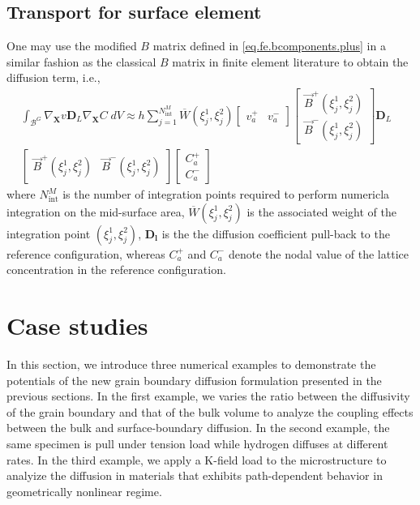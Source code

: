 \documentclass[10pt]{elsarticle}
\newcommand{\mbs}[1]{\boldsymbol{#1}}
\def\bs{{\mbs{s}}} \def\bt{{\mbs{t}}} \def\bu{{\mbs{u}}}
\def\bs{\boldsymbol}
\newcommand{\tensor}[1]{\ensuremath{\boldsymbol{#1}}}
\begin{document}
\subsection{Transport for surface element}
One may use the modified $B$ matrix defined in
\eqref{eq.fe.bcomponents.plus} in a similar fashion as the classical 
$B$ matrix in finite element literature to obtain the diffusion term, i.e., 
\begin{align}
\label{eq:DiscreteDiffusion} 
 \int_{\mathcal{B}^{G}} \nabla_{\bs{X}} v \bs{D}_{L} \nabla_{\bs{X}} C \; dV
  \approx   
h \sum_{j=1}^{N^{M}_{\text{int}}}  \overline{W}(\xi_{j}^{1}, \xi_{j}^{2})
\begin{bmatrix} v_{a}^{+} &  v_{a}^{-} \end{bmatrix} 
\begin{bmatrix} \vec{B}^{+}(\xi_{j}^{1}, \xi_{j}^{2}) \\ \vec{B}^{-}(\xi_{j}^{1}, \xi_{j}^{2}) \end{bmatrix}
\tensor{D}_{L} \nonumber \\
\begin{bmatrix} \vec{B}^{+}(\xi_{j}^{1}, \xi_{j}^{2}) & \vec{B}^{-}(\xi_{j}^{1}, \xi_{j}^{2}) \end{bmatrix} 
\begin{bmatrix} C_{a}^{+} \\ C_{a}^{-} \end{bmatrix} &
\end{align}
where $N^{M}_{\text{int}}$ is the number of integration points required to 
perform numericla integration on the mid-surface area, 
$\overline{W}(\xi^{1}_{j}, \xi_{j}^{2})$ is the associated weight
of the integration point $(\xi^{1}_{j}, \xi_{j}^{2})$, $\tensor{D_{l}}$ is the 
the diffusion coefficient pull-back to the reference configuration, whereas 
$C_{a}^{+}$ and $C_{a}^{-}$ denote the nodal value of the lattice
concentration in the reference configuration.  
 
\section{Case studies}
In this section, we introduce three numerical examples to demonstrate the potentials of the 
new grain boundary diffusion formulation presented in the previous sections.
In the first example, we varies the ratio between the diffusivity of the grain boundary 
and that of the bulk volume to analyze the coupling effects between the bulk
and surface-boundary diffusion. In the second example, the same specimen is pull 
under tension load while hydrogen diffuses at different rates. In the third example,
we apply a K-field load to the microstructure to analyize the diffusion in materials that 
exhibits path-dependent behavior in geometrically nonlinear regime.  
\end{document}
